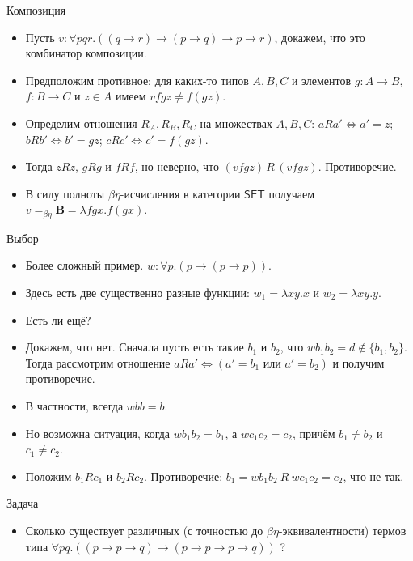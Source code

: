 \documentclass[xcolor=dvipsnames]{beamer}
\newcommand{\Bx}{\mathbf{B}}
\newcommand{\SET}{\mathsf{SET}}
\begin{document}
\begin{frame}{Композиция}
 
 \begin{itemize}
  \item Пусть $v \colon \forall p q r . 
  ((q \to r) \to (p \to q) \to p \to r)$, докажем, что это комбинатор композиции.
  \item Предположим противное: для каких-то типов $A,B,C$ и элементов $g \colon A \to B$, $f \colon B \to C$ и $z \in A$ имеем $v f g z \ne f(g z)$. 
  \item Определим отношения $R_A, R_B, R_C$ на множествах $A,B,C$: $a R a' \iff a' = z$; $b R b' \iff b' = g z$; $c R c' \iff c' = f(g z)$. 
  \item Тогда $z R z$, $g R g$ и $f R f$, но неверно, что $(v f g z)\, R\, (v f g z)$. Противоречие.
  \item В силу полноты $\beta\eta$-исчисления в категории $\SET$ получаем $v =_{\beta\eta} \Bx = \lambda f g x . f(gx)$.
 \end{itemize}

 
\end{frame}

\begin{frame}{Выбор}
 
 \begin{itemize}[<+->]
  \item Более сложный пример. $w : \forall p. (p \to (p \to p))$.
  \item Здесь есть две существенно разные функции: $w_1 = \lambda x y . x$ и $w_2 = \lambda x y. y$.
  \item Есть ли ещё?
  \item Докажем, что нет. Сначала пусть есть такие $b_1$ и $b_2$, что $w b_1 b_2 = d \notin \{ b_1, b_2 \}$. Тогда рассмотрим отношение $a R a' \iff (a' = b_1 \mbox{ или } a' = b_2)$ и получим противоречие.
  \item В частности, всегда $w b b = b$.
  \item Но возможна ситуация, когда $w b_1 b_2 = b_1$, а $w c_1 c_2 = c_2$, причём $b_1 \ne b_2$ и $c_1 \ne c_2$. 
  \item Положим $b_1 R c_1$ и $b_2 R c_2$. Противоречие:
  $b_1 = w b_1 b_2 \: R \: w c_1 c_2 = c_2$, что не так.
 \end{itemize}

\end{frame}


\begin{frame}{Задача}
 
 \begin{itemize}
  \item Сколько существует различных (с точностью до $\beta\eta$-эквивалентности) термов типа 
  $\forall p q. ((p \to p \to q) \to
  (p \to p \to p \to q))$\: ?
 \end{itemize}

\end{frame}
\end{document}
